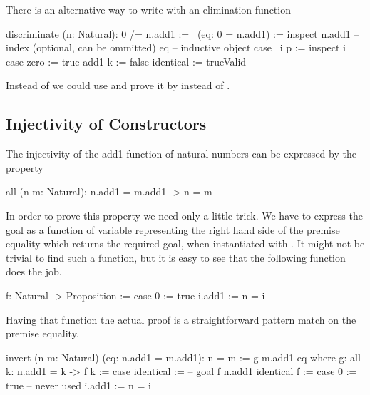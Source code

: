 There is an alternative way to write  with an elimination
function

\begin{alba}
    discriminate (n: Natural): 0 /= n.add1 :=
        \ (eq: 0 = n.add1) :=
            inspect
                n.add1     -- index (optional, can be ommitted)
                eq              -- inductive object
            case
                {\ i p :=
                    inspect i case
                        zero := true
                        add1 k := false}
                identical := trueValid
\end{alba}

Instead of  we could use  and
prove it by  instead of .




\subsection{Injectivity of Constructors}

The injectivity of the add1 function of natural numbers can be expressed
by the property

\begin{alba}
    all (n m: Natural): n.add1 = m.add1  ->  n = m
\end{alba}

In order to prove this property we need only a little trick. We have to
express the goal  as a function of variable representing the right
hand side of the premise equality which returns the required goal, when
instantiated with . It might not be trivial to find such a
function, but it is easy to see that the following function does the job.

\begin{alba}
    f: Natural -> Proposition :=
        case 0 :=
                true
             i.add1 :=
                n = i
\end{alba}
%
Having that function the actual proof is a straightforward pattern match on the
premise equality.


\begin{alba}
    invert (n m: Natural) (eq: n.add1 = m.add1): n = m
    :=
        g m.add1 eq
        where
            g: all k: n.add1 = k -> f k :=
                case identical :=
                    -- goal f n.add1
                    identical
            f :=
                case
                    0 :=
                        true -- never used
                    i.add1 :=
                        n = i
\end{alba}


